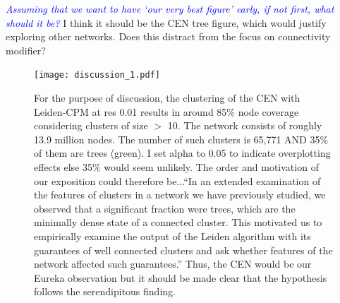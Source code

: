 \documentclass[12pt, oneside]{article}   	%
\begin{document}
\textcolor{blue}{\emph{Assuming that we want to have `our very best figure' early, if not first, what should it be?}} I think it should be the CEN tree figure, which would justify exploring other networks.  Does this distract from the focus on connectivity modifier?

\begin{figure}[H]
\centering
\texttt{[image: discussion\_1.pdf]}
\caption{For the purpose of discussion, the clustering of the CEN with Leiden-CPM at res 0.01 results in around 85\% node coverage considering clusters of size $>$ 10. The network consists of roughly 13.9 million nodes. The number of such clusters is 65,771 AND 35\% of them are trees (green). I set alpha to 0.05 to indicate overplotting effects else 35\% would seem unlikely. The order and motivation of our exposition could therefore be...``In an extended examination of the features of clusters in a network we have previously studied, we observed that a significant fraction were trees, which are the minimally dense state of a connected cluster. This motivated us to empirically examine the output of the Leiden algorithm with its guarantees of well connected clusters and ask whether features of the network affected such guarantees.'' Thus, the CEN would be our Eureka observation but it should be made clear that the hypothesis follows the serendipitous finding.}
\end{figure}
\end{document}
